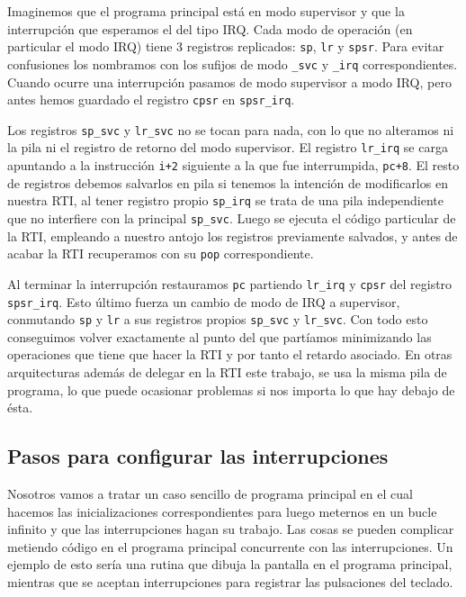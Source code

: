 Imaginemos que el programa principal está en modo supervisor y que la interrupción que
esperamos el del tipo IRQ.
Cada modo de operación (en particular el modo IRQ) tiene 3 registros replicados: {\tt sp}, {\tt lr} y {\tt spsr}.
Para evitar confusiones los nombramos con los sufijos de modo {\tt \_svc} y {\tt \_irq} correspondientes.
Cuando ocurre una interrupción pasamos de modo supervisor a modo IRQ, pero antes hemos guardado
el registro {\tt cpsr} en {\tt spsr\_irq}.

Los registros {\tt sp\_svc} y {\tt lr\_svc} no se tocan para nada, con lo que no alteramos ni la
pila ni el registro de retorno del modo supervisor. El registro {\tt lr\_irq} se carga apuntando a la
instrucción {\tt i+2} siguiente a la que fue interrumpida, {\tt pc+8}. El resto de registros debemos salvarlos en pila si tenemos la intención
de modificarlos en nuestra RTI, al tener registro propio {\tt sp\_irq} se trata de una pila
independiente que no interfiere con la principal {\tt sp\_svc}. Luego se ejecuta el código
particular de la RTI, empleando a nuestro antojo los registros previamente salvados, y antes de
acabar la RTI recuperamos con su {\tt pop} correspondiente.

Al terminar la interrupción restauramos {\tt pc} partiendo {\tt lr\_irq} y {\tt cpsr} del registro
{\tt spsr\_irq}. Esto último fuerza un cambio de modo de IRQ a supervisor, conmutando {\tt sp} y {\tt lr}
a sus registros propios {\tt sp\_svc} y {\tt lr\_svc}. Con todo esto conseguimos volver exactamente
al punto del que partíamos minimizando las
operaciones que tiene que hacer la RTI y por tanto el retardo asociado. En otras arquitecturas
además de delegar en la RTI este trabajo, se usa la misma pila de programa, lo que puede
ocasionar problemas si nos importa lo que hay debajo de ésta.

\subsection{Pasos para configurar las interrupciones}

Nosotros vamos a tratar un caso sencillo de programa principal en el cual hacemos las
inicializaciones correspondientes para luego meternos en un bucle infinito y que las
interrupciones hagan su trabajo. Las cosas se pueden complicar metiendo código en
el programa principal concurrente con las interrupciones. Un ejemplo de esto sería
una rutina que dibuja la pantalla en el programa principal, mientras que se aceptan
interrupciones para registrar las pulsaciones del teclado.

